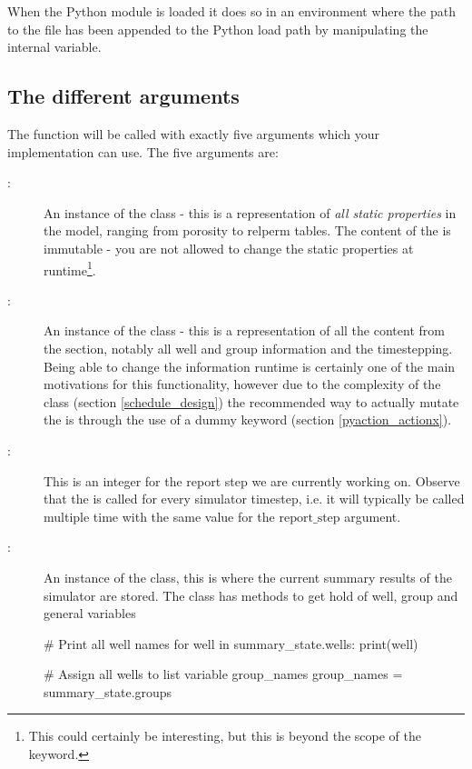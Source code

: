 When the Python module is loaded it does so in an environment where the path to
the  file has been appended to the Python load path by manipulating
the internal  variable.

 
\subsection{The different arguments}
The  function will be called with exactly five arguments which
your implementation can use. The five arguments are:
\begin{description}
\item[:] An instance of the 
  class - this is a representation of \emph{all static properties} in the model,
  ranging from porosity to relperm tables. The content of the
   is immutable - you are not allowed to change the static
  properties at runtime\footnote{This could certainly be interesting, but this
  is beyond the scope of the \pyaction{} keyword.}.
\item[:] An instance of the 
  class - this is a representation of all the content from the 
  section, notably all well and group information and the timestepping. Being
  able to change the  information runtime is certainly one of the
  main motivations for this functionality, however due to the complexity of
  the  class (section \ref{schedule_design})
  the recommended way to actually mutate the  is
  through the use of a dummy \actionx{} keyword (section
  \ref{pyaction_actionx}).
\item[:] This is an integer for the report step we
  are currently working on. Observe that the \pyaction{} is called for every
  simulator timestep, i.e. it will typically be called multiple time with
  the same value for the $\mathrm{report\_step}$ argument.
\item[:] An instance of the
   class, this is where the current summary
  results of the simulator are stored. The  class has
  methods to get hold of well, group and general variables
  \begin{code}
    # Print all well names
    for well in summary_state.wells:
        print(well)

    # Assign all wells to list variable group_names
    group_names = summary_state.groups


\end{code}
\end{description}
